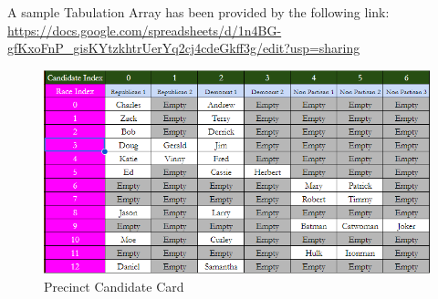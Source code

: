 \documentclass[preprint,13pt]{elsarticle}
\begin{document}
A sample Tabulation Array has been provided by the following link:
\url{https://docs.google.com/spreadsheets/d/1n4BG-gfKxoFnP_gisKYtzkhtrUerYq2cj4cdeGkff3g/edit?usp=sharing}

\begin{figure}[bp!]
\begin{center}
\caption{Precinct Candidate Card}
\includegraphics[width=400pt]{Candidate Card.png}
\end{center}
\end{figure}
\newpage
\end{document}
